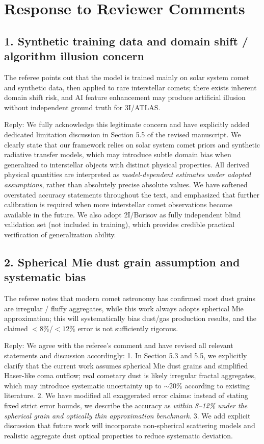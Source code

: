 \documentclass[apj,twocolumn]{aastex631}
\begin{document}
\section{Response to Reviewer Comments}
\subsection{1. Synthetic training data and domain shift / algorithm illusion concern}
The referee points out that the model is trained mainly on solar system comet and synthetic data, then applied to rare interstellar comets; there exists inherent domain shift risk, and AI feature enhancement may produce artificial illusion without independent ground truth for 3I/ATLAS.

Reply:
We fully acknowledge this legitimate concern and have explicitly added dedicated limitation discussion in Section 5.5 of the revised manuscript. We clearly state that our framework relies on solar system comet priors and synthetic radiative transfer models, which may introduce subtle domain bias when generalized to interstellar objects with distinct physical properties. All derived physical quantities are interpreted as \textit{model-dependent estimates under adopted assumptions}, rather than absolutely precise absolute values. We have softened overstated accuracy statements throughout the text, and emphasized that further calibration is required when more interstellar comet observations become available in the future. We also adopt 2I/Borisov as fully independent blind validation set (not included in training), which provides credible practical verification of generalization ability.

\subsection{2. Spherical Mie dust grain assumption and systematic bias}
The referee notes that modern comet astronomy has confirmed most dust grains are irregular / fluffy aggregates, while this work always adopts spherical Mie approximation; this will systematically bias dust/gas production results, and the claimed $<8\%$/$<12\%$ error is not sufficiently rigorous.

Reply:
We agree with the referee’s comment and have revised all relevant statements and discussion accordingly:
1. In Section 5.3 and 5.5, we explicitly clarify that the current work assumes spherical Mie dust grains and simplified Haser-like coma outflow; real cometary dust is likely irregular fractal aggregates, which may introduce systematic uncertainty up to $\sim20\%$ according to existing literature.
2. We have modified all exaggerated error claims: instead of stating fixed strict error bounds, we describe the accuracy as \textit{within 8–12\% under the spherical grain and optically thin approximation benchmark}.
3. We add explicit discussion that future work will incorporate non-spherical scattering models and realistic aggregate dust optical properties to reduce systematic deviation.
\end{document}
